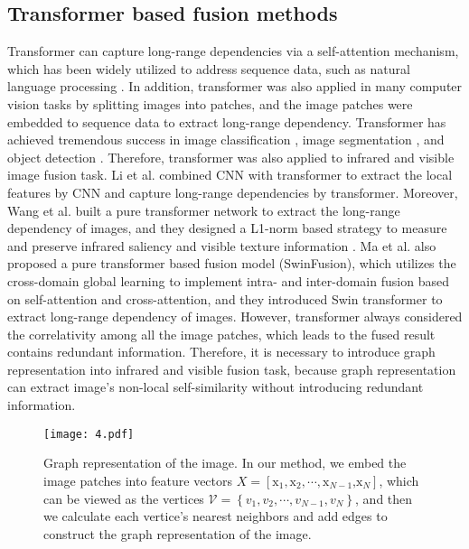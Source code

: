 \documentclass[journal]{IEEEtran}
\begin{document}
\subsection{Transformer based fusion methods}
Transformer can capture long-range dependencies via a self-attention mechanism, which has been widely utilized to address sequence data, such as natural language processing \cite{devlin2019bert}. In addition, transformer was also applied in many computer vision tasks by splitting images into patches, and the image patches were embedded to sequence data to extract long-range dependency. Transformer has achieved tremendous success in image classification \cite{zheng2021rethinking}, image segmentation \cite{carion2020end}, and object detection \cite{dosovitskiy2021image}. Therefore, transformer was also applied to infrared and visible image fusion task. Li et al. \cite{li2022cgtf} combined CNN with transformer to extract the local features by CNN and capture long-range dependencies by transformer. Moreover, Wang et al. built a pure transformer network to extract the long-range dependency of images, and they designed a L1-norm based strategy to measure and preserve infrared saliency and visible texture information  \cite{wang2022swinfuse}. Ma et al. \cite{ma2022swinfusion} also proposed a pure transformer based fusion model (SwinFusion), which utilizes the cross-domain global learning to implement intra- and inter-domain fusion based on self-attention and cross-attention, and they introduced Swin transformer to extract long-range dependency of images. However, transformer always considered the correlativity among all the image patches, which leads to the fused result contains redundant information. Therefore, it is necessary to introduce graph representation into infrared and visible fusion task, because graph representation can extract image's non-local self-similarity without introducing redundant information.

\begin{figure}[!t]
\centering
\texttt{[image: 4.pdf]}
\caption{Graph representation of the image. In our method, we embed the image patches into feature vectors $X=\left[ {{\text{x}}_{1}},{{\text{x}}_{2}},\cdots ,{{\text{x}}_{N-1}}\text{,}{{\text{x}}_{N}} \right]$, which can be viewed as the vertices $\mathcal{V}=\left\{ {{v}_{1}},{{v}_{2}},\cdots ,{{v}_{N-1}},{{v}_{N}} \right\}$, and then we calculate each vertice's nearest neighbors and add edges to construct the graph representation of the image.}
\label{FIG:4}
\end{figure}
\end{document}
